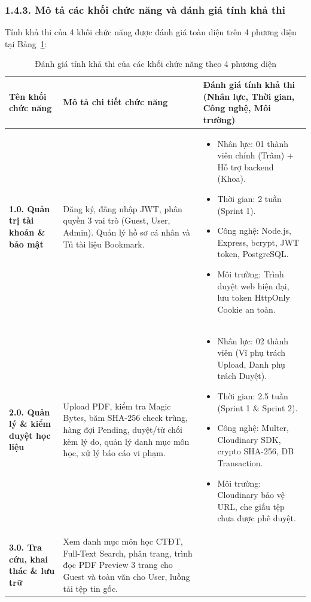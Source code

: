 \subsubsection{1.4.3. Mô tả các khối chức năng và đánh giá tính khả thi}
Tính khả thi của 4 khối chức năng được đánh giá toàn diện trên 4 phương diện tại Bảng~\ref{tab:feasibility}:

\begin{table}[htbp]
\centering
\small
\caption{Đánh giá tính khả thi của các khối chức năng theo 4 phương diện}
\label{tab:feasibility}
\begin{tabularx}{\textwidth}{|p{3.2cm}|X|X|}
\hline
\textbf{Tên khối chức năng} & \textbf{Mô tả chi tiết chức năng} & \textbf{Đánh giá tính khả thi (Nhân lực, Thời gian, Công nghệ, Môi trường)} \\
\hline
\textbf{1.0. Quản trị tài khoản \& bảo mật} & Đăng ký, đăng nhập JWT, phân quyền 3 vai trò (Guest, User, Admin). Quản lý hồ sơ cá nhân và Tủ tài liệu Bookmark. & 
\begin{itemize}[leftmargin=*,noitemsep,topsep=0pt]
    \item Nhân lực: 01 thành viên chính (Trâm) + Hỗ trợ backend (Khoa).
    \item Thời gian: 2 tuần (Sprint 1).
    \item Công nghệ: Node.js, Express, bcrypt, JWT token, PostgreSQL.
    \item Môi trường: Trình duyệt web hiện đại, lưu token HttpOnly Cookie an toàn.
\end{itemize} \\
\hline
\textbf{2.0. Quản lý \& kiểm duyệt học liệu} & Upload PDF, kiểm tra Magic Bytes, băm SHA-256 check trùng, hàng đợi Pending, duyệt/từ chối kèm lý do, quản lý danh mục môn học, xử lý báo cáo vi phạm. & 
\begin{itemize}[leftmargin=*,noitemsep,topsep=0pt]
    \item Nhân lực: 02 thành viên (Vĩ phụ trách Upload, Danh phụ trách Duyệt).
    \item Thời gian: 2.5 tuần (Sprint 1 \& Sprint 2).
    \item Công nghệ: Multer, Cloudinary SDK, crypto SHA-256, DB Transaction.
    \item Môi trường: Cloudinary bảo vệ URL, che giấu tệp chưa được phê duyệt.
\end{itemize} \\
\hline
\textbf{3.0. Tra cứu, khai thác \& lưu trữ} & Xem danh mục môn học CTĐT, Full-Text Search, phân trang, trình đọc PDF Preview 3 trang cho Guest và toàn văn cho User, luồng tải tệp tin gốc. & 

\end{tabularx}
\end{table}

